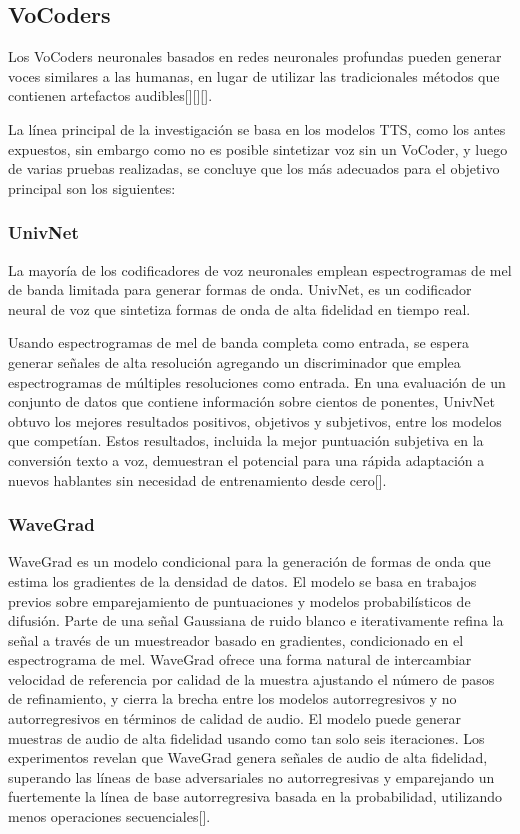 \subsection{VoCoders}
  Los VoCoders neuronales basados en redes neuronales profundas pueden generar voces similares a las humanas, en lugar de utilizar las tradicionales
  métodos que contienen artefactos audibles[\cite{griffin1984signal}][\cite{kawahara1999restructuring}][\cite{morise2016world}]. 
  
  La línea principal de la investigación se basa en los modelos TTS, como los antes expuestos, sin embargo como no es posible sintetizar voz sin un VoCoder, y luego de varias pruebas realizadas, se concluye que los más adecuados para el objetivo principal son los siguientes:

\subsubsection{UnivNet}
La mayoría de los codificadores de voz neuronales emplean espectrogramas de mel de banda limitada para generar formas de onda. UnivNet, es un codificador neural de voz que sintetiza formas de onda de alta fidelidad en tiempo real. 

Usando espectrogramas de mel de banda completa como entrada, se espera generar señales de alta resolución agregando un discriminador que emplea espectrogramas de múltiples resoluciones como entrada. En una evaluación de un conjunto de datos que contiene información sobre cientos de ponentes, UnivNet obtuvo los mejores resultados positivos, objetivos y subjetivos,  entre los modelos que competían. Estos resultados, incluida la mejor puntuación subjetiva en la conversión texto a voz, demuestran el potencial para una rápida adaptación a nuevos hablantes sin necesidad de entrenamiento desde cero[\cite{jang2021univnet}].

\subsubsection{WaveGrad}

WaveGrad es un modelo condicional para la generación de formas de onda que estima los gradientes de la densidad de datos. El modelo se basa en trabajos previos sobre emparejamiento de puntuaciones y modelos probabilísticos de difusión. Parte de una señal Gaussiana de ruido blanco e iterativamente refina la señal a través de un muestreador basado en gradientes, condicionado en el espectrograma de mel. WaveGrad ofrece una forma natural de intercambiar velocidad de referencia por calidad de la muestra ajustando el número de pasos de refinamiento, y cierra la brecha entre los modelos autorregresivos y no autorregresivos en términos de calidad de audio. El modelo puede generar muestras de audio de alta fidelidad usando como tan solo seis iteraciones. Los experimentos revelan que WaveGrad genera señales de audio de alta fidelidad, superando las líneas de base adversariales no autorregresivas y emparejando un fuertemente la línea de base autorregresiva basada en la probabilidad, utilizando menos operaciones secuenciales[\cite{chen2020wavegrad}].


